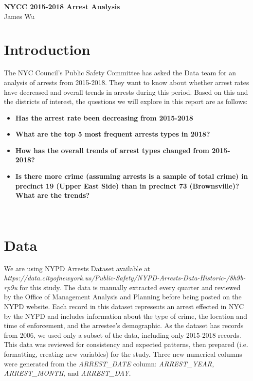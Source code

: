 \documentclass[11pt]{article}\usepackage[]{graphicx}\usepackage[]{color}
\begin{document}
\begin{center}
\textbf{NYCC 2015-2018 Arrest Analysis}\\
\normalsize{James Wu}
\end{center}

\section{Introduction}
The NYC Council's Public Safety Committee has asked the Data team for an analysis of arrests from 2015-2018. They want to know about whether arrest rates have decreased and overall trends in arrests during this period. Based on this and the districts of interest, the questions we will explore in this report are as follows:
\begin{itemize}
  \item \textbf{Has the arrest rate been decreasing from 2015-2018}
  \item \textbf{What are the top 5 most frequent arrests types in 2018?}
  \item \textbf{How has the overall trends of arrest types changed from 2015-2018?}
  \item \textbf{Is there more crime (assuming arrests is a sample of total crime) in precinct 19 (Upper East Side) than in precinct 73 (Brownsville)? What are the trends?}
\end{itemize}
\\

\section{Data}
We are using NYPD Arrests Dataset available at \emph{https://data.cityofnewyork.us/Public-Safety/NYPD-Arrests-Data-Historic-/8h9b-rp9u} for this study. The data is manually extracted every quarter and reviewed by the Office of Management Analysis and Planning before being posted on the NYPD website. Each record in this dataset represents an arrest effected in NYC by the NYPD and includes information about the type of crime, the location and time of enforcement, and the arrestee's demographic. As the dataset has records from 2006, we used only a subset of the data, including only 2015-2018 records. This data was reviewed for consistency and expected patterns, then prepared (i.e. formatting, creating new variables) for the study. Three new numerical columns were generated from the \textit{ARREST\_DATE} column: \textit{ARREST\_YEAR}, \textit{ARREST\_MONTH}, and \textit{ARREST\_DAY}.
\end{document}
